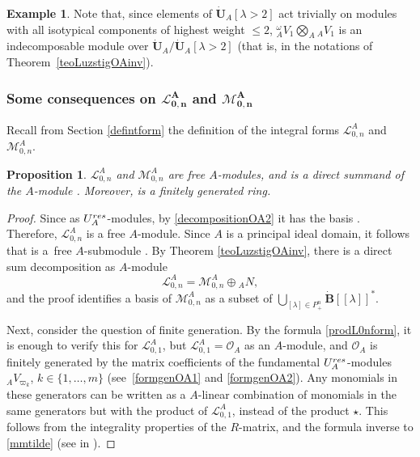 \documentclass[11pt]{article}
\numberwithin{equation}{section}
\numberwithin{equation}{section}
\newtheorem{prop}[teo]{Proposition}
\theoremstyle{definition}
\newtheorem{exa}[teo]{Example}
\newcommand{\Ll}{{\mathcal L}}
\newcommand{\Mm}{{\mathcal M}}
\newcommand{\Oo}{{\mathcal O}}
\begin{document}
\begin{exa}
{Note that, since elements of $\dot{\mathbf{U}}_A [\lambda > 2]$ act trivially on modules with all isotypical components of highest weight $\leq 2$, ${}_A^\omega V_1\bigotimes_A {}_AV_1$ is an indecomposable module over $\dot{\mathbf{U}}_A / \dot{\mathbf{U}}_A [\lambda > 2]$ (that is,  in the notations of Theorem~\ref{teoLuzstigOAinv}).}\end{exa}

\subsubsection[Some consequences on L\_{0,n}\^A and M\_{0,n}\^A]{Some consequences on $\boldsymbol{\Ll_{0,n}^A}$ and $\boldsymbol{\Mm_{0,n}^A}$}

Recall from Section \ref{defintform} the definition of the integral forms $\Ll_{0,n}^A$ and $\Mm_{0,n}^A$.
\begin{prop}\label{L0NAfgfree} $\Ll_{0,n}^A$ and $\Mm_{0,n}^A$ are free $A$-modules, and \smash{$\Mm_{0,n}^A$} is a direct summand of the $A$-module \smash{$\Ll_{0,n}^A$}. Moreover, \smash{$\Ll_{0,n}^A$} is a finitely generated ring.
\end{prop}
\begin{proof} Since \smash{$\Ll_{0,n}^A = \Oo_A^{\otimes n}$} as $U_A^{\rm res}$-modules, by \eqref{decompositionOA2} it has the basis . Therefore, $\Ll_{0,n}^A$ is a free $A$-module. Since $A$ is a principal ideal domain, it follows that \smash{$\Mm_{0,n}^A$} is a~free $A$-submodule \cite[Appendix~2.2]{Lang}. By Theorem \ref{teoLuzstigOAinv}, there is a direct sum decomposition as $A$-module
\begin{equation}\label{decomposition OAn}
\Ll_{0,n}^A = \Mm_{0,n}^A \oplus {}_AN,
\end{equation} and the proof identifies a basis of $\Mm_{0,n}^A$ as a subset of $\bigcup_{[\lambda]\in P_+^n}\dot{\mathbf{B}} [[\lambda]]^*$.

Next, consider the question of finite generation. By the formula \eqref{prodL0nform}, it is enough to verify this for ${\mathcal L}_{0,1}^A$, but ${\mathcal L}_{0,1}^A= \Oo_A$ as an $A$-module, and $\Oo_A$ is finitely generated by the matrix coefficients of the fundamental $U_A^{\rm res}$-modules ${}_AV_{\varpi_k}$, $k\in\{1,\dots,m\}$ (see~\eqref{formgenOA1} and \eqref{formgenOA2}). Any monomials in these generators can be written as a $A$-linear combination of monomials in the same generators but with the product of $\Ll_{0,1}^A$, instead of the product $\star$. This follows from the integrality properties of the $R$-matrix, and the formula inverse to \eqref{mmtilde} (see in \cite[Section 3.3 and the formulas (4.6)--(4.8)]{BR}).
\end{proof}
\end{document}
